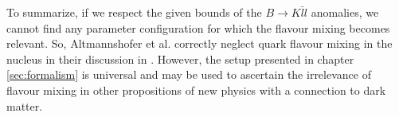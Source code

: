 \clearpage
To summarize, if we respect the given bounds of the $B\rightarrow K\bar{l}l$ anomalies, we cannot find any parameter configuration for which the flavour mixing becomes relevant. So, Altmannshofer et al. correctly neglect quark flavour mixing in the nucleus in their discussion in \cite{Z}. However, the setup presented in chapter \ref{sec:formalism} is universal and may be used to ascertain the irrelevance of flavour mixing in other propositions of new physics with a connection to dark matter.